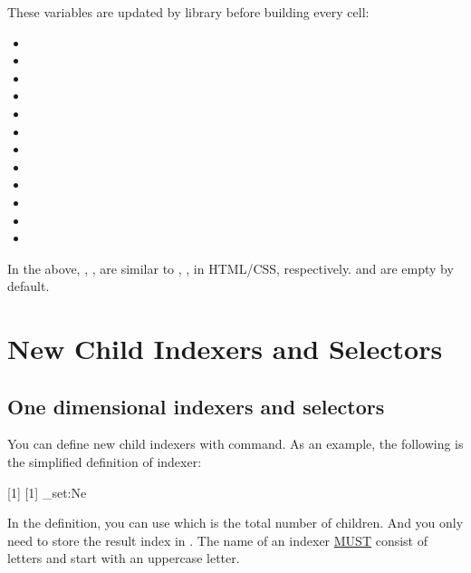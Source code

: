 \documentclass[oneside]{book}
\begin{document}
{These variables are updated by  library before building every cell:
\begin{itemize}[nosep]
  \item \CC{\lTblrCellAboveBorderStyleTl}
  \item \CC{\lTblrCellAboveBorderWidthDim}
  \item \CC{\lTblrCellAboveBorderColorTl}
  \item \CC{\lTblrCellBelowBorderStyleTl}
  \item \CC{\lTblrCellBelowBorderWidthDim}
  \item \CC{\lTblrCellBelowBorderColorTl}
  \item \CC{\lTblrCellLeftBorderStyleTl}
  \item \CC{\lTblrCellLeftBorderWidthDim}
  \item \CC{\lTblrCellLeftBorderColorTl}
  \item \CC{\lTblrCellRightBorderStyleTl}
  \item \CC{\lTblrCellRightBorderWidthDim}
  \item \CC{\lTblrCellRightBorderColorTl}
\end{itemize}
In the above, , ,  are similar to
, ,  in HTML/CSS, respectively.
 and  are empty by default.

\section{New Child Indexers and Selectors}

\subsection{One dimensional indexers and selectors}

You can define new child indexers with \CC{\NewTblrChildIndexer} command.
As an example, the following is the simplified definition of  indexer:
\begin{codehigh}
\ExplSyntaxOn
{} [1] [1]
  {
    \tl_set:Ne 
  }
\ExplSyntaxOff
\end{codehigh}
In the definition, you can use \CC{\lTblrChildTotalInt} which is the total number of children.
And you only need to store the result index  in \CC{\lTblrChildIndexTl}.
The name of an indexer \underline{MUST} consist of letters and start with an uppercase letter.

}
\end{document}

